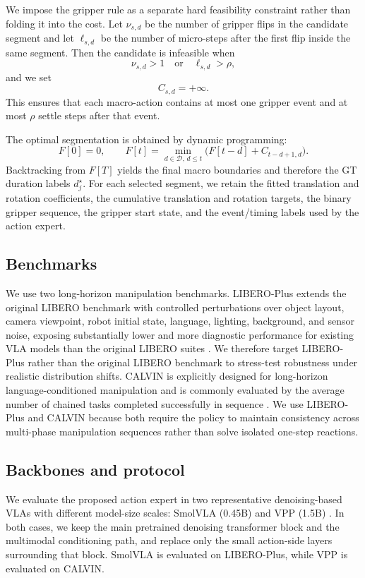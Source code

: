 \documentclass[10pt,twocolumn,letterpaper]{article}
\begin{document}
We impose the gripper rule as a separate hard feasibility constraint rather than folding it into the cost. Let $\nu_{s,d}$ be the number of gripper flips in the candidate segment and let $\ell_{s,d}$ be the number of micro-steps after the first flip inside the same segment. Then the candidate is infeasible when
\begin{equation}
\nu_{s,d}>1 \quad \text{or} \quad \ell_{s,d}>\rho,
\end{equation}
and we set
\begin{equation}
C_{s,d}=+\infty.
\end{equation}
This ensures that each macro-action contains at most one gripper event and at most $\rho$ settle steps after that event.

The optimal segmentation is obtained by dynamic programming:
\begin{equation}
F[0]=0, \qquad
F[t]=\min_{d\in\mathcal{D},\,d\le t}\bigl(F[t-d]+C_{t-d+1,d}\bigr).
\label{eq:dp}
\end{equation}
Backtracking from $F[T]$ yields the final macro boundaries and therefore the GT duration labels $d_j^{\star}$. For each selected segment, we retain the fitted translation and rotation coefficients, the cumulative translation and rotation targets, the binary gripper sequence, the gripper start state, and the event/timing labels used by the action expert.

\subsection{Benchmarks}
We use two long-horizon manipulation benchmarks. LIBERO-Plus extends the original LIBERO benchmark with controlled perturbations over object layout, camera viewpoint, robot initial state, language, lighting, background, and sensor noise, exposing substantially lower and more diagnostic performance for existing VLA models than the original LIBERO suites \cite{libero2023,liberoplus2025}. We therefore target LIBERO-Plus rather than the original LIBERO benchmark to stress-test robustness under realistic distribution shifts. CALVIN is explicitly designed for long-horizon language-conditioned manipulation and is commonly evaluated by the average number of chained tasks completed successfully in sequence \cite{calvin2021}. We use LIBERO-Plus and CALVIN because both require the policy to maintain consistency across multi-phase manipulation sequences rather than solve isolated one-step reactions.

\subsection{Backbones and protocol}
We evaluate the proposed action expert in two representative denoising-based VLAs with different model-size scales: SmolVLA (0.45B) and VPP (1.5B) \cite{smolvla2025,vpp2024}. In both cases, we keep the main pretrained denoising transformer block and the multimodal conditioning path, and replace only the small action-side layers surrounding that block. SmolVLA is evaluated on LIBERO-Plus, while VPP is evaluated on CALVIN.
\end{document}
